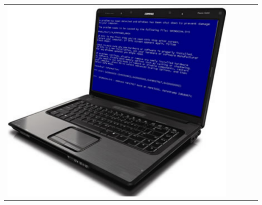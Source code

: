 \begin{frame}
\begin{description}[short]
\begin{tabular}{ccccc}
    \includegraphics[scale=0.025]{input/content/figures/blue_screen.pdf}
  \end{tabular}
\end{description}
\end{frame}
